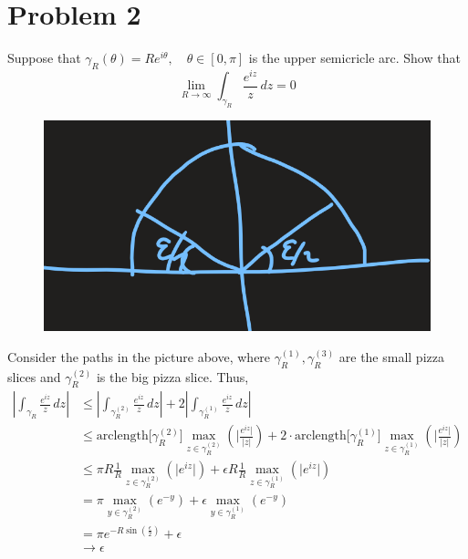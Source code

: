 \documentclass[11pt]{article}
\begin{document}
\section*{Problem 2}
\begin{problem}
    Suppose that $\gamma_R(\theta) = Re^{i\theta}, \quad \theta \in [0, \pi]$ is the upper semicricle arc. Show that 
    \[\lim_{R\to \infty}\int_{\gamma_R} \frac{e^{iz}}{z}\,dz = 0\]
\end{problem}
\begin{figure}[H]
    \centering
    \includegraphics[width=0.5\linewidth]{Images/non-assmnet.png}
\end{figure}
\begin{solution}
Consider the paths in the picture above, where $\gamma_R^{(1)}, \gamma_R^{(3)}$ are the small pizza slices and $\gamma_R^{(2)}$ is the big pizza slice. Thus, 
\begin{align*}
    \left|\int_{\gamma_R} \frac{e^{iz}}{z}\, dz\right| &\leq \left|\int_{\gamma_R^{(2)}} \frac{e^{iz}}{z}\, dz\right| + 2\left|\int_{\gamma_R^{(1)}} \frac{e^{iz}}{z}\, dz\right|\\
    &\leq \text{arclength}\big[\gamma_R^{(2)}\big]\max_{z \in \gamma_R^{(2)}}(|\frac{e^{iz}|}{|z|}) + 2\cdot \text{arclength}\big[\gamma_R^{(1)}\big]\max_{z \in \gamma_R^{(1)}}(|\frac{e^{iz}|}{|z|})\\
    &\leq \pi R \frac{1}{R}\max_{z \in \gamma_R^{(2)}}(|{e^{iz}|}) + \epsilon R \frac{1}{R}\max_{z \in \gamma_R^{(1)}}(|{e^{iz}|})\\
    &= \pi \max_{y \in \gamma_R^{(2)}}({e^{-y}}) + \epsilon \max_{y \in \gamma_R^{(1)}}({e^{-y}})\\
    &= \pi {e^{-R\sin(\frac{\epsilon}{2})}} + \epsilon \\
    &\to \epsilon
\end{align*}

\end{solution}
\newpage
\end{document}
